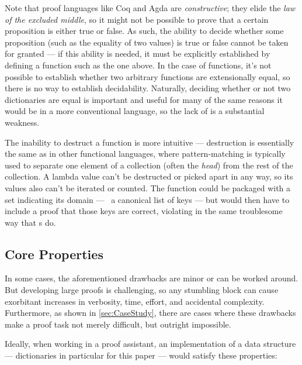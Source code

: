 Note that proof languages like Coq and Agda are \emph{constructive}; they elide the \emph{law of the excluded middle}, so it might not be possible to prove that a certain proposition is either true or false.
%
As such, the ability to decide whether some proposition (such as the equality of two values) is true or false cannot be taken for granted --- if this ability is needed, it must be explicitly established by defining a function such as the one above.
%
In the case of functions, it's not possible to establish whether two arbitrary functions are extensionally equal, so there is no way to establish decidability.
%
Naturally, deciding whether or not two dictionaries are equal is important and useful for many of the same reasons it would be in a more conventional language, so the lack of \DecidableEq{} is a substantial weakness.


The inability to destruct a function is more intuitive --- destruction is essentially the same as in other functional languages, where pattern-matching is typically used to separate one element of a collection (often the \emph{head}) from the rest of the collection.
%
A lambda value can't be destructed or picked apart in any way, so its values also can't be iterated or counted.
%
The function could be packaged with a set indicating its domain --- \ie{}~a canonical list of keys --- but would then have to include a proof that those keys are correct, violating \SemTot{} in the same troublesome way that \cal{}s do.

\subsection{Core Properties}
\label{sec:Introduction:props}

In some cases, the aforementioned drawbacks are minor or can be worked around.
%
But developing large proofs is challenging, so any stumbling block can cause exorbitant increases in verbosity, time, effort, and accidental complexity.
%
Furthermore, as shown in \autoref{sec:CaseStudy}, there are cases where these drawbacks make a proof task not merely difficult, but outright impossible.


Ideally, when working in a proof assistant, an implementation of a data structure --- dictionaries in particular for this paper --- would satisfy these properties:

